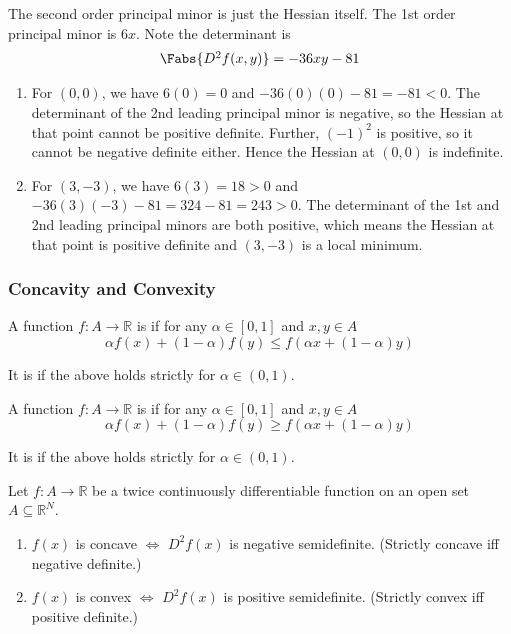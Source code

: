 \documentclass{article}
\begin{document}
The second order principal minor is just the Hessian itself. The 1st order principal minor is $6x$. Note the determinant is
\begin{equation}
  \begin{array}{c}
    \Fabs{D^2 f(x, y)} = -36xy - 81
  \end{array}
  \nonumber
\end{equation}

\begin{enumerate}
  \item For $(0, 0)$, we have $6(0) = 0$ and $-36(0)(0) - 81 = -81 < 0$. The determinant of the 2nd leading principal minor is negative, so the Hessian at that point cannot be positive definite. Further, $(-1)^2$ is positive, so it cannot be negative definite either. Hence the Hessian at $(0, 0)$ is indefinite.

  \item For $(3, -3)$, we have $6(3) = 18 > 0$ and $-36(3)(-3) - 81 = 324 - 81 = 243 > 0$. The determinant of the 1st and 2nd leading principal minors are both positive, which means the Hessian at that point is positive definite and $(3, -3)$ is a local minimum.
\end{enumerate}

\subsubsection{Concavity and Convexity}
\label{ssub:concavity_and_convexity}

\begin{definition}
  A function $f: A \to \mathbb{R}$ is  if for any $\alpha \in [0, 1]$ and $x, y \in A$
  \[
    \alpha f(x) + (1 - \alpha) f(y)
    \le
    f(\alpha x + (1 - \alpha) y)
  \]

  It is  if the above holds strictly for $\alpha \in (0, 1)$.
\end{definition}

\begin{definition}
  A function $f: A \to \mathbb{R}$ is  if for any $\alpha \in [0, 1]$ and $x, y \in A$
  \[
    \alpha f(x) + (1 - \alpha) f(y)
    \ge
    f(\alpha x + (1 - \alpha) y)
  \]

  It is  if the above holds strictly for $\alpha \in (0, 1)$.
\end{definition}

\begin{theorem}
  Let $f: A \to \mathbb{R}$ be a twice continuously differentiable function on an open set $A \subseteq \mathbb{R}^N$.
  \begin{enumerate}
    \item $f(x)$ is concave $\iff$ $D^2f(x)$ is negative semidefinite. (Strictly concave iff negative definite.)
    \item $f(x)$ is convex $\iff$ $D^2f(x)$ is positive semidefinite. (Strictly convex iff positive definite.)
  \end{enumerate}
\end{theorem}
\end{document}
